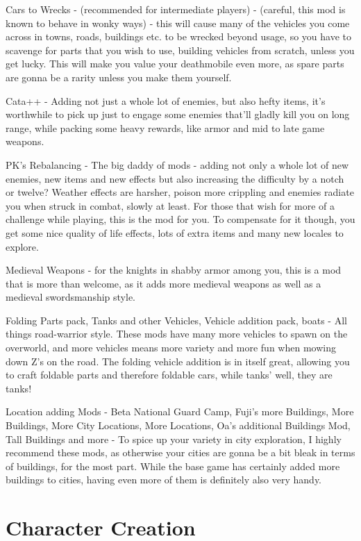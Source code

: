 \documentclass[11pt]{report}
\begin{document}
Cars to Wrecks - (recommended for intermediate players) -
(careful, this mod is known to behave in wonky ways) - this will cause many of the vehicles you come across in towns, roads, buildings etc. to be wrecked beyond usage, so you have to scavenge for parts that you wish to use, building vehicles from scratch, unless you get lucky. This will make you value your deathmobile even more, as spare parts are gonna be a rarity unless you make them yourself.

Cata++ - Adding not just a whole lot of enemies, but also hefty items, it's worthwhile to pick up just to engage some enemies that'll gladly kill you on long range, while packing some heavy rewards, like armor and mid to late game weapons.

PK's Rebalancing - The big daddy of mods - adding not only a whole lot of new enemies, new items and new effects but also increasing the difficulty by a notch or twelve? Weather effects are harsher, poison more crippling and enemies radiate you when struck in combat, slowly at least. For those that wish for more of a challenge while playing, this is the mod for you. To compensate for it though, you get some nice quality of life effects, lots of extra items and many new locales to explore.

Medieval Weapons - for the knights in shabby armor among you, this is a mod that is more than welcome, as it adds more medieval weapons as well as a medieval swordsmanship style.

Folding Parts pack, Tanks and other Vehicles, Vehicle addition pack, boats - All things road-warrior style. These mods have many more vehicles to spawn on the overworld, and more vehicles means more variety and more fun when mowing down Z's on the road. The folding vehicle addition is in itself great, allowing you to craft foldable parts and therefore foldable cars, while tanks' well, they are tanks!

Location adding Mods - Beta National Guard Camp, Fuji's more Buildings, More Buildings, More City Locations, More Locations, Oa's additional Buildings Mod, Tall Buildings and more - To spice up your variety in city exploration, I highly recommend these mods, as otherwise your cities are gonna be a bit bleak in terms of buildings, for the most part. While the base game has certainly added more buildings to cities, having even more of them is definitely also very handy.

\chapter{Character Creation}
\end{document}
